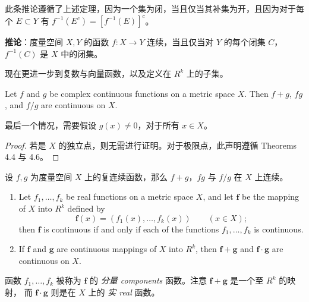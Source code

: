 \documentclass[../poma-notes.tex]{subfiles}
\begin{document}
此条推论遵循了上述定理，因为一个集为闭，当且仅当其补集为开，且因为对于每个 $E \subset Y$ 有 $f^{-1}(E^c) = [f^{-1}(E)]^c$。

\begin{anote}
  \textbf{推论}：度量空间 $X, Y$ 的函数 $f: X \to Y$ 连续，当且仅当对 $Y$ 的每个闭集 $C$，$f^{-1}(C)$ 是 $X$ 中的闭集。
\end{anote}

现在更进一步到复数与向量函数，以及定义在 $R^k$ 上的子集。

\begin{theorem}
  Let $f$ and $g$ be complex continuous functions on a metric space $X$. Then $f + g$, $fg$, and $f/g$ are
  continuous on $X$.
\end{theorem}

最后一个情况，需要假设 $g(x) \ne 0$，对于所有 $x \in X$。

\begin{proof}
  若是 $X$ 的独立点，则无需进行证明。对于极限点，此声明遵循 Theorems 4.4 与 4.6。
\end{proof}

\begin{anote}
  设 $f, g$ 为度量空间 $X$ 上的复连续函数，那么 $f + g$，$fg$ 与 $f/g$ 在 $X$ 上连续。
\end{anote}
\newpage

\begin{theorem}\mbox{}\par
  \begin{enumerate}[label=(\alph*)]
    \item Let $f_1, \dots, f_k$ be real functions on a metric space $X$, and let $\mathbf{f}$ be the mapping of
          $X$ into $R^k$ defined by
          \begin{equation}
            \mathbf{f}(x) = (f_1(x),\dots,f_k(x)) \qquad (x \in X);
          \end{equation}
          then $\mathbf{f}$ is continuous if and only if each of the functions $f_1,\dots,f_k$ is continuous.
    \item If $\mathbf{f}$ and $\mathbf{g}$ are continuous mappings of $X$ into $R^k$, then $\mathbf{f + g}$
          and $\mathbf{f \cdot g}$ are continuous on $X$.
  \end{enumerate}
\end{theorem}

函数 $f_1,\dots,f_k$ 被称为 $\mathbf{f}$ 的 \textit{分量 components} 函数。注意 $\mathbf{f + g}$ 是一个至 $R^k$ 的映射，
而 $\mathbf{f \cdot g}$ 则是在 $X$ 上的 \textit{实 real} 函数。
\end{document}
